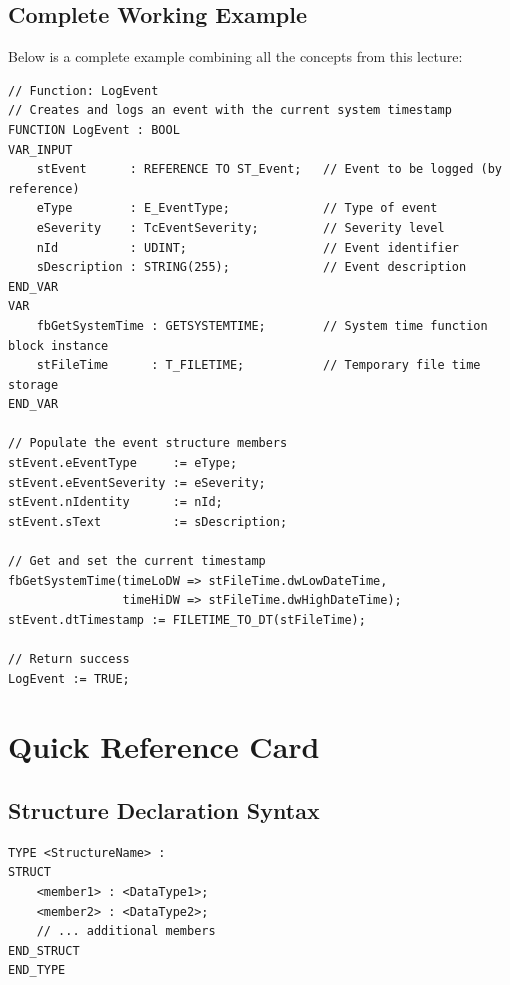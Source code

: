 \documentclass[11pt,a4paper]{article}
\begin{document}
\subsection{Complete Working Example}

Below is a complete example combining all the concepts from this lecture:

\begin{lstlisting}
// Function: LogEvent
// Creates and logs an event with the current system timestamp
FUNCTION LogEvent : BOOL
VAR_INPUT
    stEvent      : REFERENCE TO ST_Event;   // Event to be logged (by reference)
    eType        : E_EventType;             // Type of event
    eSeverity    : TcEventSeverity;         // Severity level
    nId          : UDINT;                   // Event identifier
    sDescription : STRING(255);             // Event description
END_VAR
VAR
    fbGetSystemTime : GETSYSTEMTIME;        // System time function block instance
    stFileTime      : T_FILETIME;           // Temporary file time storage
END_VAR

// Populate the event structure members
stEvent.eEventType     := eType;
stEvent.eEventSeverity := eSeverity;
stEvent.nIdentity      := nId;
stEvent.sText          := sDescription;

// Get and set the current timestamp
fbGetSystemTime(timeLoDW => stFileTime.dwLowDateTime,
                timeHiDW => stFileTime.dwHighDateTime);
stEvent.dtTimestamp := FILETIME_TO_DT(stFileTime);

// Return success
LogEvent := TRUE;
\end{lstlisting}

\section*{Quick Reference Card}

\subsection*{Structure Declaration Syntax}

\begin{lstlisting}
TYPE <StructureName> :
STRUCT
    <member1> : <DataType1>;
    <member2> : <DataType2>;
    // ... additional members
END_STRUCT
END_TYPE
\end{lstlisting}
\end{document}
